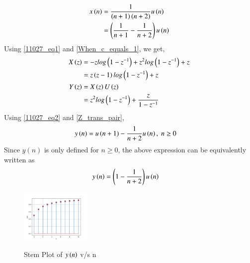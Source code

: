 \documentclass[journal,12pt,twocolumn]{IEEEtran}
\theoremstyle{remark}
\begin{document}
\solution
\begin{table}[ht]

\end{table}
\begin{align}
x\left(n\right) &= \frac{1}{\left(n+1\right)\left(n+2\right)}u\left(n\right)\\
& = \left(\frac{1}{n+1} - \frac{1}{n+2}\right)u\left(n\right)
\end{align}
Using \eqref{11027_eq1} and \eqref{When_c_equals_1}, we get,
\begin{align}X\left(z\right) &= -z log\left(1-z^{-1}\right) + z^2 log\left(1-z^{-1}\right) + z\\
&= z\left(z-1\right)log\left(1-z^{-1}\right) + z\\
    Y\left(z\right) &= X\left(z\right)U\left(z\right)\\
     &=z^2log\left(1-z^{-1}\right) + \frac{z}{1-z^{-1}}
\end{align}
Using \eqref{11027_eq2} and \eqref{Z_trans_pair},
\begin{align}
    y\left(n\right) &= u\left(n+1\right) - \frac{1}{n+2}u\left(n\right) , \; n \geq 0
\end{align}
Since $y(n)$ is only defined for $n \geq 0$, the above expression can be equivalently written as
\begin{align}
	y\left(n\right) &= \left(1-\frac{1}{n+2}\right) u\left(n\right)
\end{align}
\newpage
\begin{figure}[h]
    \includegraphics[width=0.3\textwidth]{figs/y(n)_vs_n.png}\label{fig:stem-plot}
    \caption{Stem Plot of $y\left(n\right)$ v/s n}
\end{figure}
\end{document}
